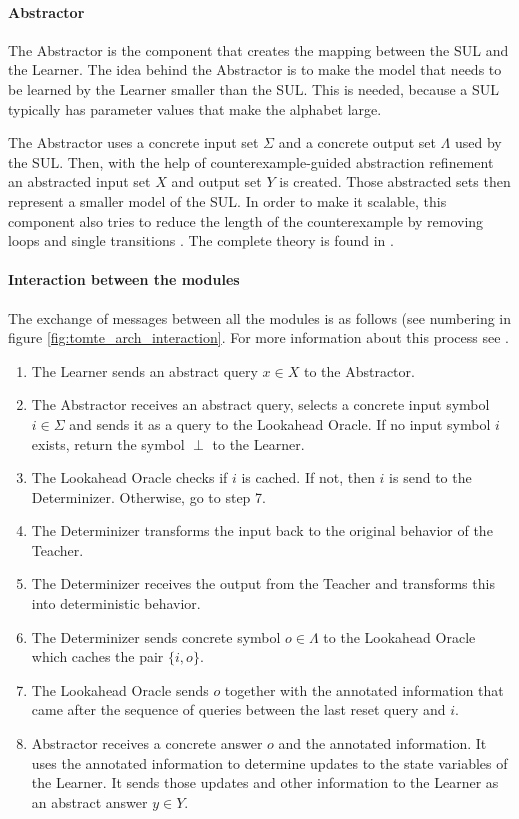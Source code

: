 \documentclass[multi,crop=false,class=article]{standalone}
\begin{document}
\paragraph{Abstractor} The Abstractor is the component that creates the mapping
between the SUL and the Learner. The idea behind the Abstractor is to make the
model that needs to be learned by the Learner smaller than the SUL. This is
needed, because a SUL typically has parameter values that make the alphabet
large.

The Abstractor uses a concrete input set $\Sigma$ and a concrete
output set $\Lambda$ used by the SUL. Then, with the help of
counterexample-guided abstraction refinement\cite[p. 104]{Tomte2014} an
abstracted input set $X$ and output set $Y$ is created. Those abstracted sets
then represent a smaller model of the SUL. In order to make it scalable, this
component also tries to reduce the length of the counterexample by removing
loops and single transitions \cite{Koopman2014}. The complete theory is found
in \cite{Tomte2014}.

\paragraph{Interaction between the modules} The exchange of messages between
all the modules is as follows (see numbering in figure
\ref{fig:tomte_arch_interaction}. For more information about this process see
\cite{Aarts2015,Tomte2014}.

\begin{enumerate}
	\item The Learner sends an abstract query $x \in X$ to the Abstractor.
	\item The Abstractor receives an abstract query, selects a concrete input
	symbol $i \in \Sigma$ and sends it as a query to the Lookahead
	Oracle. If no input symbol $i$ exists, return the symbol $\perp$ to the
	Learner.
	\item The Lookahead Oracle checks if $i$ is cached. If not, then $i$ is send
	to the Determinizer. Otherwise, go to step 7.
	\item The Determinizer transforms the input back to the original behavior of
	the Teacher.
	\item The Determinizer receives the output from the Teacher and transforms
	this into deterministic behavior.
	\item The Determinizer sends concrete symbol $o \in \Lambda$ to the
	Lookahead Oracle which caches the pair $\{i,o\}$.
	\item The Lookahead Oracle sends $o$ together with the annotated information
	that came after the sequence of queries between the last reset query and
	$i$.
	\item Abstractor receives a concrete answer $o$ and the annotated
	information. It uses the annotated information to determine updates to the
	state variables of the Learner. It sends those updates and other
	information to the Learner as an abstract answer $y \in Y$.
\end{enumerate}
\end{document}
